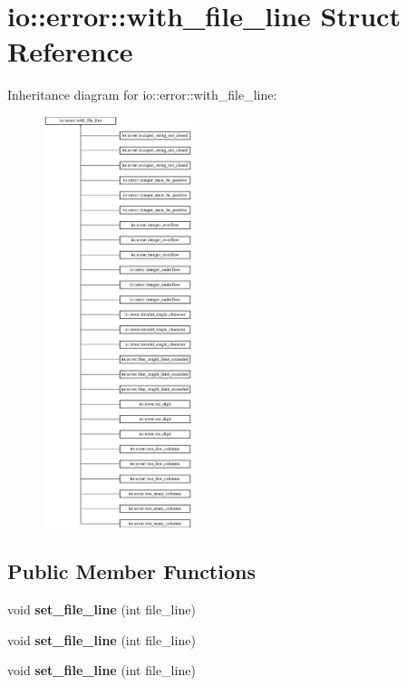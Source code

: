 \hypertarget{structio_1_1error_1_1with__file__line}{}\section{io\+:\+:error\+:\+:with\+\_\+file\+\_\+line Struct Reference}
\label{structio_1_1error_1_1with__file__line}
Inheritance diagram for io\+:\+:error\+:\+:with\+\_\+file\+\_\+line\+:\begin{figure}[H]
\begin{center}
\leavevmode
\includegraphics[height=12.000000cm]{d2/d34/structio_1_1error_1_1with__file__line}
\end{center}
\end{figure}
\subsection*{Public Member Functions}
\begin{DoxyCompactItemize}
\item 
\mbox{\label{structio_1_1error_1_1with__file__line_aa92778a81778abc676ec6ee9952bba8c}} 
void {\bfseries set\+\_\+file\+\_\+line} (int file\+\_\+line)
\item 
\mbox{\label{structio_1_1error_1_1with__file__line_aa92778a81778abc676ec6ee9952bba8c}} 
void {\bfseries set\+\_\+file\+\_\+line} (int file\+\_\+line)
\item 
\mbox{\label{structio_1_1error_1_1with__file__line_aa92778a81778abc676ec6ee9952bba8c}} 
void {\bfseries set\+\_\+file\+\_\+line} (int file\+\_\+line)
\end{DoxyCompactItemize}

